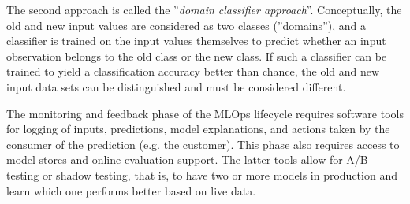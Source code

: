 The second approach is called the ''\emph{domain classifier approach}''. Conceptually, the old and new input values are considered as two classes (''domains''), and a classifier is trained on the input values themselves to predict whether an input observation belongs to the old class or the new class. If such a classifier can be trained to yield a classification accuracy better than chance, the old and new input data sets can be distinguished and must be considered different. 

The monitoring and feedback phase of the MLOps lifecycle requires software tools for logging of inputs, predictions, model explanations, and actions taken by the consumer of the prediction (e.g. the customer). This phase also requires access to model stores and online evaluation support. The latter tools allow for A/B testing or shadow testing, that is, to have two or more models in production and learn which one performs better based on live data. 

